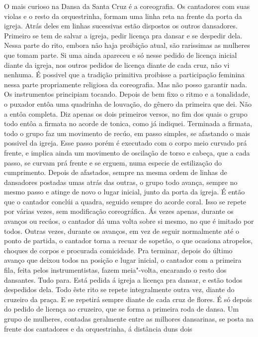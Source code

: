O mais curioso na Dansa da Santa Cruz é a coreografia. Os cantadores com
suas violas e o resto da orquestrinha, formam uma linha reta na frente
da porta da igreja. Atrás deles em linhas sucessivas estão dispostos os
outros dansadores. Primeiro se tem de salvar a igreja, pedir licença pra
dansar e se despedir dela. Nessa parte do rito, embora não haja
proibição atual, são rarissimas as mulheres que tomam parte. Si uma
ainda apareceu e só nesse pedido de licença inicial diante da igreja,
nos outros pedidos de licença diante de cada cruz, não vi nenhuma. É
possivel que a tradição primitiva proibisse a participação feminina
nessa parte propriamente religiosa da coreografia. Mas não posso
garantir nada. Os instrumentos principiam tocando. Depois de bem fixo o
ritmo e a tonalidade, o puxador entôa uma quadrinha de louvação, do
gênero da primeira que dei. Não a entôa completa. Diz apenas os dois
primeiros versos, no fim dos quais o grupo todo entôa a firmata no
acorde de tonica, como já indiquei. Terminada a firmata, todo o grupo
faz um movimento de recúo, em passo simples, se afastando o mais
possivel da igreja. Esse passo porém é executado com o corpo meio
curvado prá frente, e implica ainda um movimento de oscilação de torso e
cabeça, que a cada passo, se curvam prá frente e se erguem, numa especie
de estilização do cumprimento. Depois de afastados, sempre na mesma
ordem de linhas de dansadores postadas umas atrás das outras, o grupo
todo avança, sempre no mesmo passo e atinge de novo o lugar inicial,
junto da porta da igreja. É então que o cantador conclúi a quadra,
seguido sempre do acorde coral. Isso se repete por várias vezes, sem
modificação coreográfica. Ás vezes apenas, durante os avanços ou recúos,
o cantador dá uma volta sobre si mesmo, no que é imitado por todos.
Outras vezes, durante os avanços, em vez de seguir normalmente até o
ponto de partida, o cantador torna a recuar de sopetão, o que ocasiona
atropelos, choques de corpos e procurada comicidade. Pra terminar,
depois do último avanço que deixou todos na posição e lugar inicial, o
cantador com a primeira fila, feita pelos instrumentistas, fazem
meia"-volta, encarando o resto dos dansantes. Tudo para. Está pedida á
igreja a licença pra dansar, e estão todos despedidos dela. Todo êste
rito se repete integralmente outra vez, diante do cruzeiro da praça. E
se repetirá sempre diante de cada cruz de flores. É só depois do pedido
de licença ao cruzeiro, que se forma a primeira roda de dansa. Um grupo
de mulheres, contadas geralmente entre as milhores dansarinas, se posta
na frente dos cantadores e da orquestrinha, á distância duns dois
